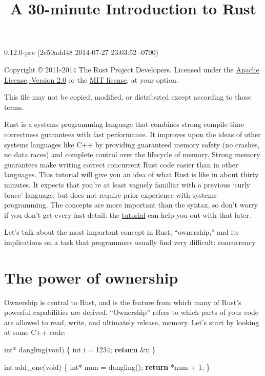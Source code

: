 \documentclass[]{article}
\title{A 30-minute Introduction to Rust}
\newenvironment{Shaded}{}{}
\newcommand{\KeywordTok}[1]{\textcolor[rgb]{0.00,0.44,0.13}{\textbf{{#1}}}}
\newcommand{\DataTypeTok}[1]{\textcolor[rgb]{0.56,0.13,0.00}{{#1}}}
\newcommand{\DecValTok}[1]{\textcolor[rgb]{0.25,0.63,0.44}{{#1}}}
\newcommand{\NormalTok}[1]{{#1}}
\begin{document}
\maketitle

0.12.0-pre (2c50add48 2014-07-27 23:03:52 -0700)

Copyright © 2011-2014 The Rust Project Developers. Licensed under the
\href{http://www.apache.org/licenses/LICENSE-2.0}{Apache License,
Version 2.0} or the \href{http://opensource.org/licenses/MIT}{MIT
license}, at your option.

This file may not be copied, modified, or distributed except according
to those terms.

{
\hypersetup{linkcolor=black}
\setcounter{tocdepth}{3}
\tableofcontents
}
Rust is a systems programming language that combines strong compile-time
correctness guarantees with fast performance. It improves upon the ideas
of other systems languages like C++ by providing guaranteed memory
safety (no crashes, no data races) and complete control over the
lifecycle of memory. Strong memory guarantees make writing correct
concurrent Rust code easier than in other languages. This tutorial will
give you an idea of what Rust is like in about thirty minutes. It
expects that you're at least vaguely familiar with a previous `curly
brace' language, but does not require prior experience with systems
programming. The concepts are more important than the syntax, so don't
worry if you don't get every last detail: the
\href{tutorial.html}{tutorial} can help you out with that later.

Let's talk about the most important concept in Rust, ``ownership,'' and
its implications on a task that programmers usually find very difficult:
concurrency.

\section{The power of ownership}\label{the-power-of-ownership}

Ownership is central to Rust, and is the feature from which many of
Rust's powerful capabilities are derived. ``Ownership'' refers to which
parts of your code are allowed to read, write, and ultimately release,
memory. Let's start by looking at some C++ code:

\begin{Shaded}
\begin{Highlighting}[]
\DataTypeTok{int}\NormalTok{* dangling(}\DataTypeTok{void}\NormalTok{)}
\NormalTok{\{}
    \DataTypeTok{int} \NormalTok{i = }\DecValTok{1234}\NormalTok{;}
    \KeywordTok{return} \NormalTok{&i;}
\NormalTok{\}}

\DataTypeTok{int} \NormalTok{add_one(}\DataTypeTok{void}\NormalTok{)}
\NormalTok{\{}
    \DataTypeTok{int}\NormalTok{* num = dangling();}
    \KeywordTok{return} \NormalTok{*num + }\DecValTok{1}\NormalTok{;}
\NormalTok{\}}
\end{Highlighting}
\end{Shaded}
\end{document}
